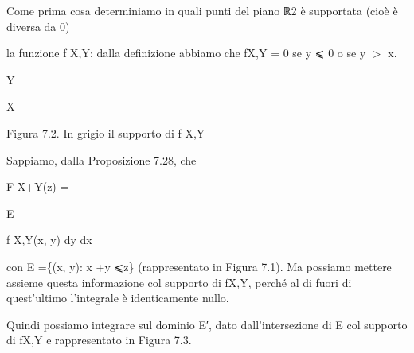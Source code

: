 \documentclass[a4paper,portrait,12pt]{article}
\begin{document}
\begin{flushleft}
Come prima cosa determiniamo in quali punti del piano ℝ2 \`{e} supportata (cio\`{e} \`{e} diversa da 0)
\end{flushleft}


\begin{flushleft}
la funzione f X,Y: dalla definizione abbiamo che fX,Y = 0 se y ⩽ 0 o se y $>$ x.
\end{flushleft}





\begin{flushleft}
Y
\end{flushleft}





\begin{flushleft}
X
\end{flushleft}


\begin{flushleft}
Figura 7.2. In grigio il supporto di f X,Y
\end{flushleft}





\begin{flushleft}
Sappiamo, dalla Proposizione 7.28, che
\end{flushleft}


\begin{flushleft}
F X+Y(z) =
\end{flushleft}





\begin{flushleft}
E
\end{flushleft}





\begin{flushleft}
f X,Y(x, y) dy dx
\end{flushleft}





\begin{flushleft}
con E =\{(x, y): x +y ⩽z\} (rappresentato in Figura 7.1). Ma possiamo mettere assieme questa informazione col supporto di fX,Y, perch\'{e} al di fuori di quest'ultimo l'integrale \`{e} identicamente nullo.
\end{flushleft}


\begin{flushleft}
Quindi possiamo integrare sul dominio E′, dato dall'intersezione di E col supporto di fX,Y e rappresentato in Figura 7.3.
\end{flushleft}
\end{document}
